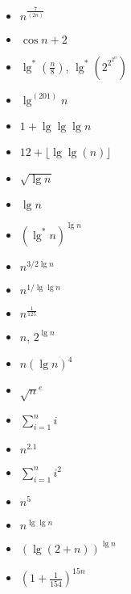 \begin{homeworkProblem} %
\begin{itemize}
\item $n^{\frac{7}{(2n)}}$
\item $\cos{n} + 2$
\item $\lg^*\left(\frac{n}{8}\right)$, $\lg^*\left(2^{2^{2^{n}}}\right)$
\item $\lg^{(201)}n$
\item $1+\lg\lg\lg n$
\item $12 + \lfloor\lg\lg(n)\rfloor$
\item $\sqrt{\lg n}$
\item $\lg n$
\item $(\lg^*n)^{\lg n}$
\item $n^{3/2\lg n}$
\item $n^{1/\lg\lg n}$
\item $n^{\frac{1}{125}}$
\item $n$, $2^{\lg n}$
\item $n(\lg n)^4$
\item $\sqrt{n}^e$
\item $\sum_{i = 1}^n i$
\item $n^{2.1}$
\item $\sum_{i = 1}^n i^2$
\item $n^{5}$
\item $n^{\lg\lg n}$
\item $(\lg(2+n))^{\lg n}$
\item $\left(1+\frac{1}{154}\right)^{15n}$

\end{itemize}
\end{homeworkProblem}
